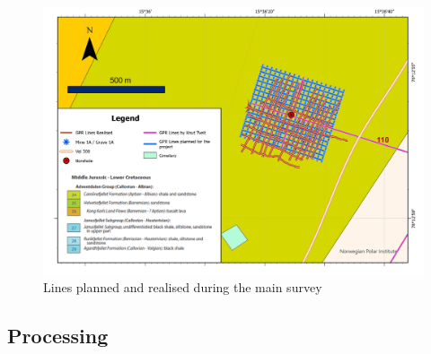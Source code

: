 \begin{figure}
    \centering
    \includegraphics[width=\linewidth]{Images/00_Methodology/GPR LIne.jpg}
    \caption{Lines planned and realised during the main survey}
    \label{fig:GPRLines}
\end{figure}

\subsection{Processing}
